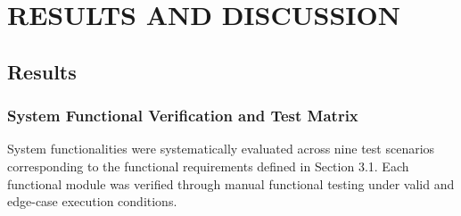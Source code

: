 \documentclass[12pt, a4paper]{article}
\begin{document}

\section{RESULTS AND DISCUSSION}

\subsection{Results}

\subsubsection{System Functional Verification and Test Matrix}

System functionalities were systematically evaluated across nine test scenarios corresponding to the functional requirements defined in Section 3.1. Each functional module was verified through manual functional testing under valid and edge-case execution conditions.
\end{document}
